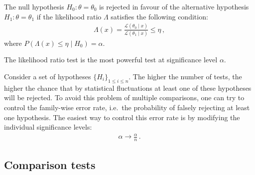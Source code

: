     \begin{definition}\label{statistics:likelihood_ratio}
        The null hypothesis $H_0:\theta=\theta_0$ is rejected in favour of the alternative hypothesis $H_1:\theta=\theta_1$ if the likelihood ratio $\Lambda$ satisfies the following condition:
        \begin{gather}
            \Lambda(x) = \frac{\mathcal{L}(\theta_0\mid x)}{\mathcal{L}(\theta_1\mid x)}\leq\eta\,,
        \end{gather}
        where $P(\Lambda(x)\leq\eta\mid H_0) = \alpha$.
    \end{definition}
    \begin{theorem}\label{statistics:neyman_pearson}
        The likelihood ratio test is the most powerful test at significance level $\alpha$.
    \end{theorem}

    \begin{construct}
        Consider a set of hypotheses $\{H_i\}_{1\leq i\leq n}$. The higher the number of tests, the higher the chance that by statistical fluctuations at least one of these hypotheses will be rejected. To avoid this problem of multiple comparisons, one can try to control the family-wise error rate, i.e.~the probability of falsely rejecting at least one hypothesis. The easiest way to control this error rate is by modifying the individual significance levels:
        \begin{gather}
            \alpha\longrightarrow\frac{\alpha}{n}\,.
        \end{gather}
    \end{construct}

\subsection{Comparison tests}


